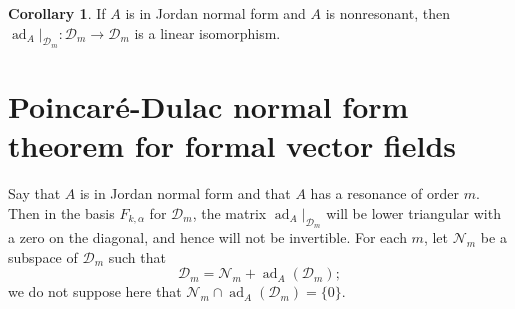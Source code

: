\documentclass{article}
\theoremstyle{definition}
\newtheorem{corollary}[theorem]{Corollary}
\newcommand{\ad}{\operatorname{ad}}
\begin{document}
\begin{corollary}
\label{invertible}
If $A$ is in Jordan normal form and $A$ is nonresonant, then $\ad_A|_{\mathscr{D}_m}:\mathscr{D}_m \to \mathscr{D}_m$ is a linear isomorphism.
\end{corollary}

\section{Poincar\'e-Dulac normal form theorem for formal vector fields}
Say that $A$ is in Jordan normal form and that $A$ has a resonance of order $m$. Then in the basis $F_{k,\alpha}$ for $\mathscr{D}_m$,
the matrix $\ad_A|_{\mathscr{D}_m}$ will be lower triangular with a zero on the diagonal, and hence will not be invertible. For each $m$, let $\mathscr{N}_m$ be a subspace of $\mathscr{D}_m$ such that
\[
\mathscr{D}_m=\mathscr{N}_m + \ad_A(\mathscr{D}_m);
\]
we do not suppose here that $\mathscr{N}_m \cap  \ad_A(\mathscr{D}_m)=\{0\}$.
\end{document}
